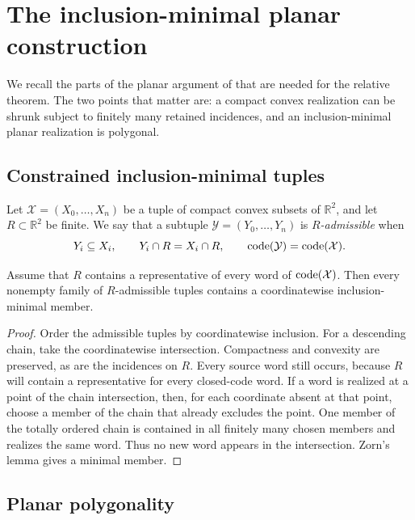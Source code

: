 \section{The inclusion-minimal planar construction}\label{sec:background}

We recall the parts of the planar argument of \citet{BukhJeffs2023} that
are needed for the relative theorem.  The two points that matter are: a
compact convex realization can be shrunk subject to finitely many retained
incidences, and an inclusion-minimal planar realization is polygonal.

\subsection{Constrained inclusion-minimal tuples}

Let $\mathcal X=(X_0,\ldots,X_n)$ be a tuple of compact convex subsets of
$\mathbb R^2$, and let $R\subset\mathbb R^2$ be finite.  We say that a
subtuple $\mathcal Y=(Y_0,\ldots,Y_n)$ is \emph{$R$-admissible} when
\[
 Y_i\subseteq X_i,\qquad Y_i\cap R=X_i\cap R,
 \qquad \operatorname{code}(\mathcal Y)=\operatorname{code}(\mathcal X).
\]

\begin{lemma}\label{lem:minimal}
Assume that $R$ contains a representative of every word of
$\operatorname{code}(\mathcal X)$.  Then every nonempty family of $R$-admissible tuples
contains a coordinatewise inclusion-minimal member.
\end{lemma}

\begin{proof}
Order the admissible tuples by coordinatewise inclusion.  For a descending
chain, take the coordinatewise intersection.  Compactness and convexity are
preserved, as are the incidences on $R$.  Every source word still occurs,
because $R$ will contain a representative for every closed-code word.  If a
word is realized at a point of the chain intersection, then, for each
coordinate absent at that point, choose a member of the chain that already
excludes the point.  One member of the totally ordered chain is contained in
all finitely many chosen members and realizes the same word.  Thus no new
word appears in the intersection.  Zorn's lemma gives a minimal member.
\end{proof}

\subsection{Planar polygonality}


